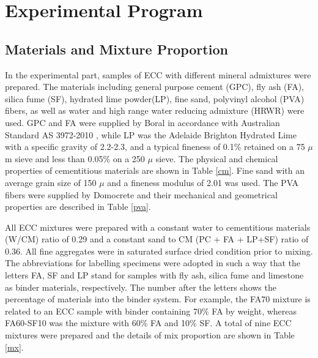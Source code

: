 \documentclass[11pt]{article}
\begin{document}
	
	\section{Experimental Program}
	\label{lab}
	
	\subsection{Materials and Mixture Proportion}
	In the experimental part, samples of ECC with different mineral admixtures were prepared. The materials including general purpose cement (GPC), fly ash (FA), silica fume (SF), hydrated lime powder(LP), fine sand, polyvinyl alcohol (PVA) fibers, as well as water and high range water reducing admixture (HRWR) were used. GPC and FA were supplied by Boral in accordance with Australian Standard AS 3972-2010 \cite{noauthor_as_nodate}, while LP was the Adelaide Brighton Hydrated Lime with a specific gravity of 2.2-2.3, and a typical fineness of 0.1\% retained on a 75 $\mu$m sieve and less than 0.05\% on a 250 $\mu$ sieve. The physical and chemical properties of cementitious materials are shown in Table \ref{cm}. Fine sand with an average grain size of 150 $\mu$ and a fineness modulus of 2.01 was used. The PVA fibers were supplied by Domocrete and their mechanical and geometrical properties are described in Table \ref{pva}.

All ECC mixtures were prepared with a constant water to cementitious materials (W/CM) ratio of 0.29 and a constant sand to CM (PC + FA + LP+SF) ratio of 0.36. All  fine aggregates were in saturated surface dried condition prior to mixing. The abbreviations for labelling specimens were adopted in such a way that the letters FA, SF and LP stand for samples with fly ash, silica fume and limestone as binder materials, respectively. The number after the letters shows the percentage of materials into the binder system. For example, the FA70 mixture is related to an ECC sample with binder containing 70\% FA by weight, whereas FA60-SF10 was the mixture with 60\% FA and 10\% SF. A total of nine ECC mixtures were prepared and the details of mix proportion are shown in Table \ref{mx}.
\end{document}
